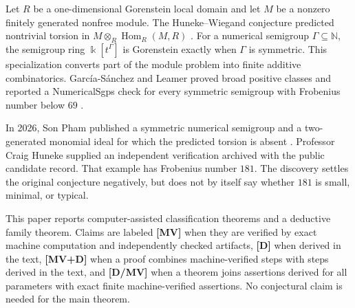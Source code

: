 \documentclass[11pt]{article}
\theoremstyle{definition}
\theoremstyle{remark}
\newcommand{\N}{\mathbb{N}}
\newcommand{\kfield}{\Bbbk}
\begin{document}
Let $R$ be a one-dimensional Gorenstein local domain and let $M$ be a nonzero finitely generated
nonfree module. The Huneke--Wiegand conjecture predicted nontrivial torsion in
$M\otimes_R\operatorname{Hom}_R(M,R)$ \cite{HunekeWiegand1994}. For a numerical semigroup
$\Gamma\subseteq\N$, the semigroup ring $\kfield[t^\Gamma]$ is Gorenstein exactly when $\Gamma$ is
symmetric. This specialization converts part of the module problem into finite additive
combinatorics. Garc\'ia-S\'anchez and Leamer proved broad positive classes and reported a
NumericalSgps check for every symmetric semigroup with Frobenius number below $69$
\cite{GarciaSanchezLeamer2013}.

In 2026, Son Pham published a symmetric numerical semigroup and a two-generated monomial ideal for
which the predicted torsion is absent \cite{Pham2026}. Professor Craig Huneke supplied an
independent verification archived with the public candidate record. That example has Frobenius
number $181$. The discovery settles the original conjecture negatively, but does not by itself say
whether $181$ is small, minimal, or typical.

This paper reports computer-assisted classification theorems and a deductive family theorem.
Claims are labeled \textbf{[MV]} when they are verified by exact machine computation and
independently checked artifacts, \textbf{[D]} when derived in the text, \textbf{[MV+D]} when a
proof combines machine-verified steps with steps derived in the text, and \textbf{[D/MV]} when a
theorem joins assertions derived for all parameters with exact finite machine-verified
assertions. No conjectural claim is needed for the main theorem.
\end{document}
